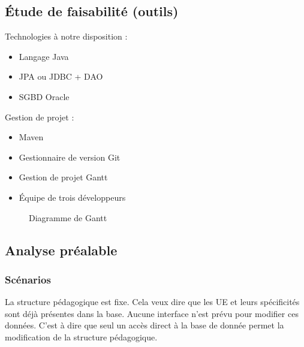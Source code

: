 \documentclass{article}
\begin{document}
\subsection{\'Etude de faisabilité (outils)}
Technologies à notre disposition :
\begin{itemize}
\item Langage Java
\item JPA ou JDBC + DAO
\item SGBD Oracle
\end{itemize}

Gestion de projet :
\begin{itemize}
\item Maven
\item Gestionnaire de version Git
\item Gestion de projet Gantt
\item \'Equipe de trois développeurs
\end{itemize}

\begin{figure}[!h]
\begin{center}
\end{center}
\caption{Diagramme de Gantt}
\end{figure}

\subsection{Analyse préalable}

\subsubsection{Scénarios}
La structure pédagogique est fixe. Cela veux dire que les UE et leurs spécificités sont déjà présentes dans la base. Aucune interface n'est prévu pour modifier ces données. C'est à dire que seul un accès direct à la base de donnée permet la modification de la structure pédagogique.
\end{document}

